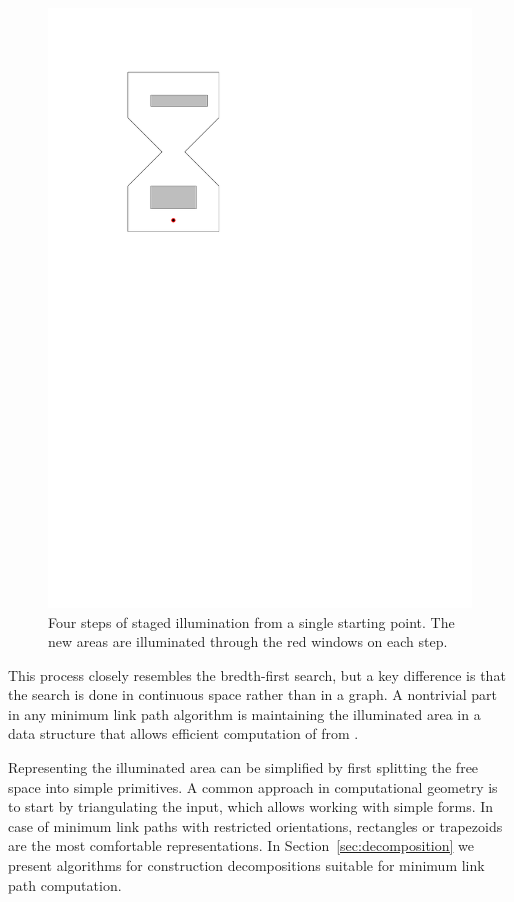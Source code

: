 \documentclass[english,gradu]{tktltiki2018}
\begin{document}
\begin{figure}
	\includegraphics[scale=0.5,page=4]{fig/staged}
	\caption{Four steps of staged illumination from a single starting point. The new areas are illuminated through the red windows on each step.}\label{fig:staged}
\end{figure}

This process closely resembles the bredth-first search, but a key difference is that the search is done in continuous space rather than in a graph.
A nontrivial part in any minimum link path algorithm is maintaining the illuminated area in a data structure that allows efficient computation of  from .

Representing the illuminated area can be simplified by first splitting the free space into simple primitives.
A common approach in computational geometry is to start by triangulating the input, which allows working with simple forms.
In case of minimum link paths with restricted orientations, rectangles or trapezoids are the most comfortable representations.
In Section~\ref{sec:decomposition} we present algorithms for construction decompositions suitable for minimum link path computation.
\end{document}
